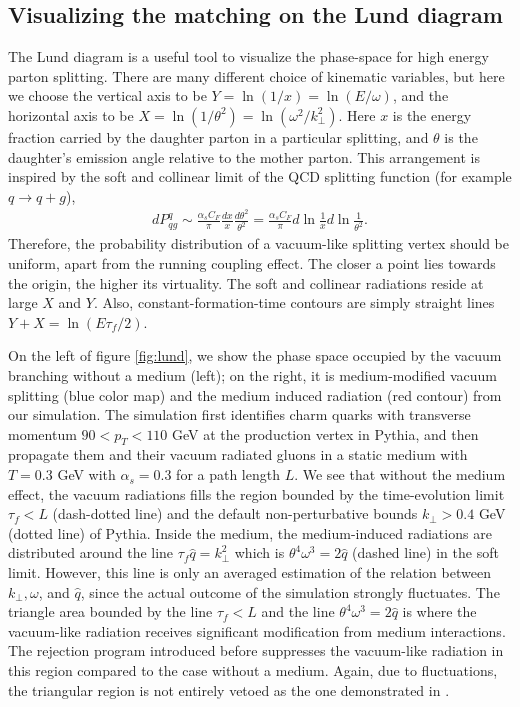 \subsection{Visualizing the matching on the Lund diagram}
The Lund diagram is a useful tool to visualize the phase-space for high energy parton splitting.
There are many different choice of kinematic variables, but here we choose the vertical axis to be $Y = \ln(1/x) = \ln(E/\omega)$, and the horizontal 
axis to be $X = \ln(1/\theta^2) = \ln(\omega^2/k_\perp^2)$.
Here $x$ is the energy fraction carried by the daughter parton in a particular splitting, and $\theta$ is the daughter's emission angle relative to the mother parton.
This arrangement is inspired by the soft and collinear limit of the QCD splitting function (for example $q\rightarrow q+g$),
\begin{eqnarray}
dP^{q}_{qg} \sim \frac{\alpha_s C_F}{\pi} \frac{dx}{x}\frac{d\theta^2}{\theta^2} = \frac{\alpha_s C_F}{\pi} d\ln\frac{1}{x} d\ln\frac{1}{\theta^2}.
\end{eqnarray}
Therefore, the probability distribution of a vacuum-like splitting vertex should be uniform, apart from the running coupling effect.
The closer a point lies towards the origin, the higher its virtuality.
The soft and collinear radiations reside at large $X$ and $Y$.
Also, constant-formation-time contours are simply straight lines $Y+X=\ln(E\tau_f/2)$.

On the left of figure \ref{fig:lund}, we show the phase space occupied by the vacuum branching without a medium (left); on the right, it is medium-modified vacuum splitting (blue color map) and the medium induced radiation (red contour) from our simulation.
The simulation first identifies charm quarks with transverse momentum $90 < p_T <110$ GeV at the production vertex in Pythia, and then propagate them and their vacuum radiated gluons in a static medium with $T=0.3$ GeV with $\alpha_s = 0.3$ for a path length $L$.
We see that without the medium effect, the vacuum radiations fills the region bounded by the time-evolution limit $\tau_f < L$ (dash-dotted line) and the default non-perturbative bounds $k_\perp > 0.4$ GeV (dotted line) of Pythia. 
Inside the medium, the medium-induced radiations are distributed around the line $\tau_f\hat{q} = k_\perp^2$ which is $\theta^4\omega^3 = 2\hat{q}$ (dashed line) in the soft limit.  
However, this line is only an averaged estimation of the relation between $k_\perp, \omega$, and $\hat{q}$, since the actual outcome of the simulation strongly fluctuates.
The triangle area bounded by the line $\tau_f < L$ and the line $\theta^4\omega^3 = 2\hat{q}$ is where the vacuum-like radiation receives significant modification from medium interactions.
The rejection program introduced before suppresses the vacuum-like radiation in this region compared to the case without a medium.
Again, due to fluctuations, the triangular region is not entirely vetoed as the one demonstrated in \cite{PhysRevLett.120.232001}.

